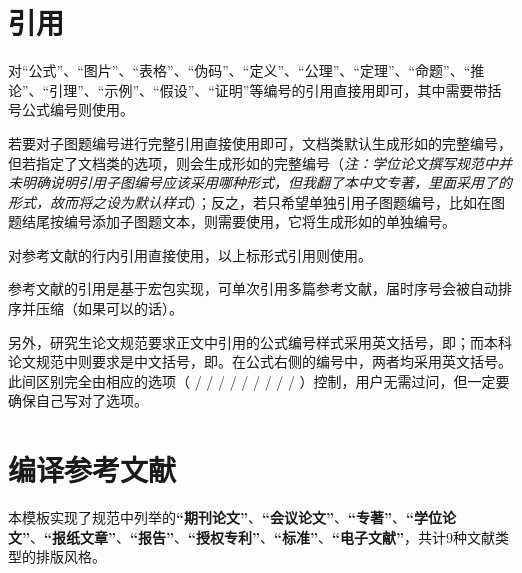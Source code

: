 \documentclass[doctor, vlined]{DissertUESTC}
\begin{document}


	
	\section{引用}
	
	对“公式”、“图片”、“表格”、“伪码”、“定义”、“公理”、“定理”、“命题”、“推论”、“引理”、“示例”、“假设”、“证明”等编号的引用直接用即可，其中需要带括号公式编号则使用。
	
	若要对子图题编号进行完整引用直接使用即可，文档类默认生成形如的完整编号，但若指定了文档类的选项，则会生成形如的完整编号（\textit{注：学位论文撰写规范中并未明确说明引用子图编号应该采用哪种形式，但我翻了本中文专著，里面采用了的形式，故而将之设为默认样式}）；反之，若只希望单独引用子图题编号，比如在图题结尾按编号添加子图题文本，则需要使用，它将生成形如的单独编号。
	
	对参考文献的行内引用直接使用，以上标形式引用则使用。
	
	参考文献的引用是基于\href{https://mirrors.zju.edu.cn/CTAN/macros/latex/contrib/natbib/natbib.pdf}{\ttfamily\color{DarkRed}}宏包实现，可单次引用多篇参考文献，届时序号会被自动排序并压缩（如果可以的话）。

	另外，研究生论文规范要求正文中引用的公式编号样式采用英文括号，即；而本科论文规范中则要求是中文括号，即。在公式右侧的编号中，两者均采用英文括号。此间区别完全由相应的选项（ /  /  /  /  /  /  /  /  / ）控制，用户无需过问，但一定要确保自己写对了选项。
	
	
	\section{编译参考文献}
	
	本模板实现了规范中列举的\textbf{“期刊论文”}、\textbf{“会议论文”}、\textbf{“专著”}、\textbf{“学位论文”}、\textbf{“报纸文章”}、\textbf{“报告”}、\textbf{“授权专利”}、\textbf{“标准”}、\textbf{“电子文献”}，共计9种文献类型的排版风格。
	
\end{document}

